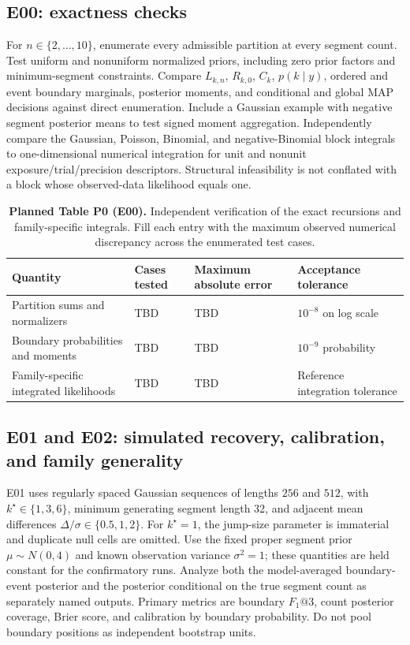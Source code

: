\subsection{E00: exactness checks}
For $n\in\{2,\ldots,10\}$, enumerate every admissible partition at every
segment count. Test uniform and nonuniform normalized priors, including zero
prior factors and minimum-segment constraints. Compare $L_{k,n}$, $R_{k,0}$,
$C_k$, $p(k\mid y)$, ordered and event boundary marginals, posterior moments,
and conditional and global MAP decisions against direct enumeration. Include a
Gaussian example with negative segment posterior means to test signed moment
aggregation. Independently compare the Gaussian, Poisson, Binomial, and
negative-Binomial block integrals to one-dimensional numerical integration for
unit and nonunit exposure/trial/precision descriptors. Structural infeasibility
is not conflated with a block whose observed-data likelihood equals one.

\begin{table}[!htbp]
\centering\small
\caption{\textbf{Planned Table P0 (E00).} Independent verification of the
exact recursions and family-specific integrals. Fill each entry with the
maximum observed numerical discrepancy across the enumerated test cases.}
\label{tab:planned-oracles-paper}
\begin{tabularx}{0.88\textwidth}{@{}Y L{0.17\textwidth}L{0.17\textwidth}L{0.19\textwidth}@{}}
\toprule
Quantity & Cases tested & Maximum absolute error & Acceptance tolerance \\
\midrule
Partition sums and normalizers & TBD & TBD & $10^{-8}$ on log scale \\
Boundary probabilities and moments & TBD & TBD & $10^{-9}$ probability \\
Family-specific integrated likelihoods & TBD & TBD & Reference integration tolerance \\
\bottomrule
\end{tabularx}
\end{table}

\subsection{E01 and E02: simulated recovery, calibration, and family generality}
E01 uses regularly spaced Gaussian sequences of lengths $256$ and $512$, with
$k^\star\in\{1,3,6\}$, minimum generating segment length 32, and adjacent
mean differences $\Delta/\sigma\in\{0.5,1,2\}$. For $k^\star=1$, the
jump-size parameter is immaterial and duplicate null cells are omitted.
Use the fixed proper segment prior $\mu\sim N(0,4)$ and known
observation variance $\sigma^2=1$; these quantities are held constant
for the confirmatory runs. Analyze both the
model-averaged boundary-event posterior and the posterior conditional on the
true segment count as separately named outputs. Primary metrics are boundary
$F_1@3$, count posterior coverage, Brier score, and calibration by boundary
probability. Do not pool boundary positions as independent bootstrap units.


